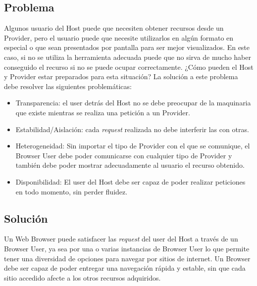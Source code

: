 \subsection{Problema}
Algunos usuario del Host puede que necesiten obtener recursos desde un Provider, pero el usuario puede que necesite utilizarlos en algún formato en especial o que sean presentados por pantalla para ser mejor visualizados. En este caso, si no se utiliza la herramienta adecuada puede que no sirva de mucho haber conseguido el recurso si no se puede ocupar correctamente. ¿Cómo pueden el Host y Provider estar preparados para esta situación?
La solución a este problema debe resolver las siguientes problemáticas:
\begin{itemize}
	\item Transparencia: el user detrás del Host no se debe preocupar de la maquinaria que existe mientras se realiza una petición a un Provider.
	\item Estabilidad/Aislación: cada \textit{request} realizada no debe interferir las con otras.
	\item Heterogeneidad: Sin importar el tipo de Provider con el que se comunique, el Browser User debe poder comunicarse con cualquier tipo de Provider y también debe poder mostrar adecuadamente al usuario el recurso obtenido.
	\item Disponibilidad: El user del Host debe ser capaz de poder realizar peticiones en todo momento, sin perder fluidez.
\end{itemize}

\subsection{Solución}
Un Web Browser puede satisfacer las \textit{request} del user del Host a través de un Browser User, ya sea por una o varias instancias de Browser User lo que permite tener una diversidad de opciones para navegar por sitios de internet. Un Browser debe ser capaz de poder entregar una navegación rápida y estable, sin que cada sitio accedido afecte a los otros recursos adquiridos.
